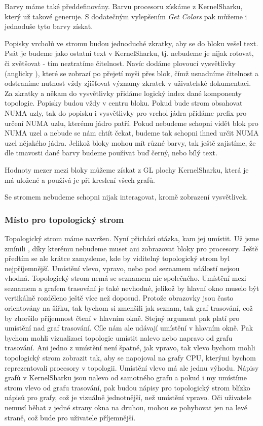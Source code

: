Barvy máme také předdefinovány. Barvu procesoru získáme z KernelSharku, který už takové generuje. S dodatečným vylepšením \emph{Get Colors} pak můžeme i jednoduše tyto barvy získat.

Popisky vrcholů ve stromu budou jednoduché zkratky, aby se do bloku vešel text. Psát je budeme jako ostatní text v KernelSharku, tj. nebudeme je nijak rotovat, či zvětšovat - tím neztratíme čitelnost. Navíc dodáme plovoucí vysvětlivky (anglicky ), které se zobrazí po přejetí myši přes blok, čímž usnadníme čitelnost a odstraníme nutnost vždy zjišťovat významy zkratek v uživatelské dokumentaci. Za zkratky a někam do vysvětlivky přidáme logický index dané komponenty topologie. Popisky budou vždy v centru bloku. Pokud bude strom obsahovat NUMA uzly, tak do popisku i vysvětlivky pro vrchol jádra přidáme prefix pro určení NUMA uzlu, kterému jádro patří. Pokud nebudeme schopni vidět blok pro NUMA uzel a nebude se nám chtít čekat, budeme tak schopni ihned určit NUMA uzel nějakého jádra. Jelikož bloky mohou mít různé barvy, tak ještě zajistíme, že dle tmavosti dané barvy budeme používat buď černý, nebo bílý text.

Hodnoty mezer mezi bloky můžeme získat z GL plochy KernelSharku, která je má uložené a používá je při kreslení všech grafů.

Se stromem nebudeme schopni nijak interagovat, kromě zobrazení vysvětlivek.

\subsubsection{Místo pro topologický strom}
Topologický strom máme navržen. Nyní přichází otázka, kam jej umístit. Už jsme zmínili , díky kterému nebudeme muset ani zobrazovat bloky pro procesory. Ještě předtím se ale krátce zamysleme, kde by viditelný topologický strom byl nejpříjemnější. Umístění vlevo, vpravo, nebo pod seznamem událostí nejsou vhodná. Topologický strom nemá se seznamem nic společného. Umístění mezi seznamem a grafem trasování je také nevhodné, jelikož by hlavní okno muselo být vertikálně rozděleno ještě více než doposud. Protože obrazovky jsou často orientovány na šířku, tak bychom si zmenšili jak seznam, tak graf trasování, což by zhoršilo příjemnost čtení v hlavním okně. Stejný argument pak platí pro umístění nad graf trasování. Cíle nám ale udávají umístění v hlavním okně. Pak bychom mohli vizualizaci topologie umístit nalevo nebo napravo od grafu trasování. Ani jedno z umístění není špatné, jak vpravo, tak vlevo bychom mohli topologický strom zobrazit tak, aby se napojoval na grafy CPU, kterými bychom reprezentovali procesory v topologii. Umístění vlevo má ale jednu výhodu. Nápisy grafů v KernelSharku jsou nalevo od samotného grafu a pokud i my umístíme strom vlevo od grafu trasování, pak budou nápisy pro topologický strom blízko nápisů pro grafy, což je vizuálně jednotnější, než umístění vpravo. Oči uživatele nemusí běhat z jedné strany okna na druhou, mohou se pohybovat jen na levé straně, což bude pro uživatele příjemnější.


